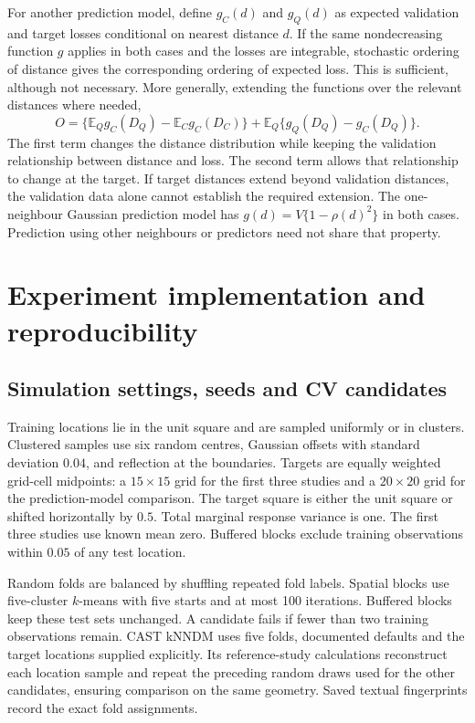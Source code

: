 \documentclass[11pt,a4paper]{article}
\newcommand{\E}{\mathbb{E}}
\begin{document}
For another prediction model, define $g_C(d)$ and $g_Q(d)$ as expected validation and target losses conditional on nearest distance $d$. If the same nondecreasing function $g$ applies in both cases and the losses are integrable, stochastic ordering of distance gives the corresponding ordering of expected loss. This is sufficient, although not necessary. More generally, extending the functions over the relevant distances where needed,
\[
O=\{\E_Qg_C(D_Q)-\E_Cg_C(D_C)\}+\E_Q\{g_Q(D_Q)-g_C(D_Q)\}.
\]
The first term changes the distance distribution while keeping the validation relationship between distance and loss. The second term allows that relationship to change at the target. If target distances extend beyond validation distances, the validation data alone cannot establish the required extension. The one-neighbour Gaussian prediction model has $g(d)=V\{1-\rho(d)^2\}$ in both cases. Prediction using other neighbours or predictors need not share that property.

\section{Experiment implementation and reproducibility}
\label{sec:implementation}
\subsection{Simulation settings, seeds and CV candidates}
\label{sec:settings}
Training locations lie in the unit square and are sampled uniformly or in clusters. Clustered samples use six random centres, Gaussian offsets with standard deviation $0.04$, and reflection at the boundaries. Targets are equally weighted grid-cell midpoints: a $15\times15$ grid for the first three studies and a $20\times20$ grid for the prediction-model comparison. The target square is either the unit square or shifted horizontally by $0.5$. Total marginal response variance is one. The first three studies use known mean zero. Buffered blocks exclude training observations within $0.05$ of any test location.

Random folds are balanced by shuffling repeated fold labels. Spatial blocks use five-cluster $k$-means with five starts and at most 100 iterations. Buffered blocks keep these test sets unchanged. A candidate fails if fewer than two training observations remain. CAST kNNDM uses five folds, documented defaults and the target locations supplied explicitly. Its reference-study calculations reconstruct each location sample and repeat the preceding random draws used for the other candidates, ensuring comparison on the same geometry. Saved textual fingerprints record the exact fold assignments.
\end{document}
